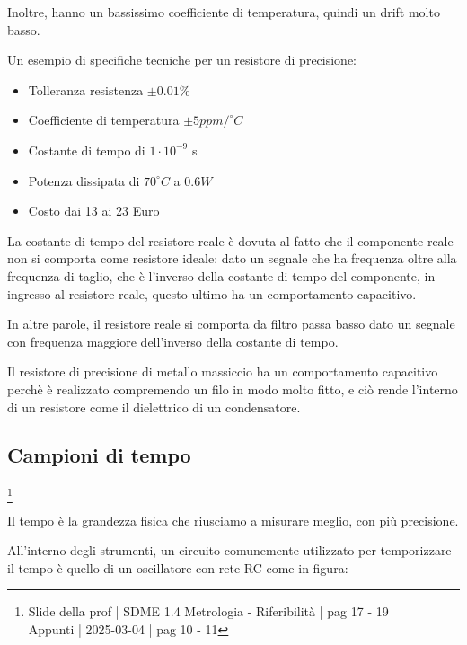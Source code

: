 Inoltre, hanno un bassissimo coefficiente di temperatura, quindi un drift molto basso. \newline 

Un esempio di specifiche tecniche per un resistore di precisione: 

\begin{itemize}
    \item Tolleranza resistenza $\pm 0.01 \% $ 
    \item Coefficiente di temperatura $\pm 5 ppm / ^{\circ} C$ 
    \item Costante di tempo di $1 \cdot 10^{-9}$ s 
    \item Potenza dissipata di $70 ^{\circ} C$ a $0.6 W$
    \item Costo dai 13 ai 23 Euro
\end{itemize}

La costante di tempo del resistore reale è dovuta al fatto che 
il componente reale non si comporta come resistore ideale: 
dato un segnale che ha frequenza oltre alla frequenza di taglio, che è l'inverso della costante di tempo del componente, 
in ingresso al resistore reale,    
questo ultimo ha un comportamento capacitivo. \newline 

In altre parole, il resistore reale si comporta da filtro passa basso 
dato un segnale con frequenza maggiore dell'inverso della costante di tempo. \newline 

Il resistore di precisione di metallo massiccio ha un comportamento capacitivo perchè è realizzato compremendo un filo in modo molto fitto, 
e ciò rende l'interno di un resistore come il dielettrico di un condensatore. \newline 

\newpage 

\subsection{Campioni di tempo}
\footnote{Slide della prof | SDME 1.4 Metrologia - Riferibilità | pag 17 - 19 \\  
Appunti | 2025-03-04 | pag 10 - 11}

Il tempo è la grandezza fisica che riusciamo a misurare meglio, con più precisione. \newline 

All'interno degli strumenti, un circuito comunemente utilizzato per temporizzare il tempo 
è quello di un oscillatore con rete RC come in figura: 

